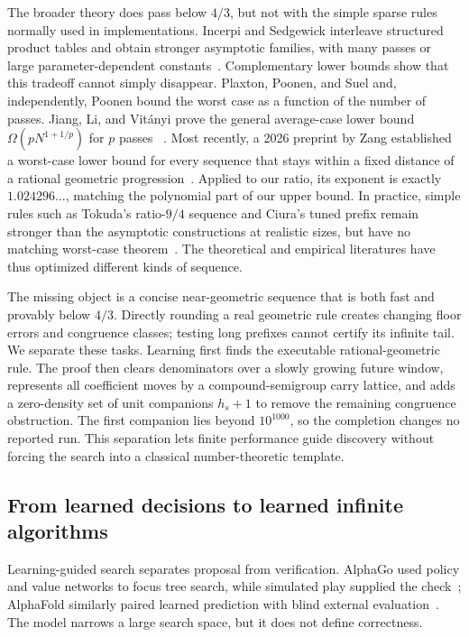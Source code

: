 The broader theory does pass below $4/3$, but not with the simple sparse rules
normally used in implementations.  Incerpi and Sedgewick interleave structured
product tables and obtain stronger asymptotic families, with many passes or
large parameter-dependent constants~\cite{incerpi1985}.  Complementary lower
bounds show that this tradeoff cannot simply disappear.  Plaxton, Poonen, and
Suel and, independently, Poonen bound the worst case as a function of the
number of passes.  Jiang, Li, and Vit\'anyi prove the general average-case lower
bound $\Omega(pN^{1+1/p})$ for $p$ passes
~\cite{plaxtonpoonen1992,poonen1993,jiang2000}.  Most recently, a 2026 preprint
by Zang established a worst-case lower bound for every sequence that stays
within a fixed distance of a rational geometric progression~\cite{zang2026}.
Applied to our ratio,
its exponent is exactly $1.024296\ldots$, matching the polynomial part of our
upper bound.  In practice, simple rules such
as Tokuda's ratio-$9/4$ sequence and Ciura's tuned prefix remain stronger than
the asymptotic constructions at realistic sizes, but have no matching
worst-case theorem~\cite{tokuda1992,ciura2001}.  The theoretical and empirical
literatures have thus optimized different kinds of sequence.

The missing object is a concise near-geometric sequence that is both fast and
provably below $4/3$.  Directly rounding a real geometric rule creates changing
floor errors and congruence classes; testing long prefixes cannot certify its
infinite tail.  We separate these tasks.  Learning first finds the executable
rational-geometric rule.  The proof then clears denominators over a slowly
growing future window, represents all coefficient moves by a compound-semigroup
carry lattice, and adds a zero-density set of unit companions $h_s+1$ to remove
the remaining congruence obstruction.  The first companion lies beyond
$10^{1000}$, so the completion changes no reported run.  This separation lets
finite performance guide discovery without forcing the search into a classical
number-theoretic template.

\subsection{From learned decisions to learned infinite algorithms}

Learning-guided search separates proposal from verification.  AlphaGo used
policy and value networks to focus tree search, while simulated play supplied
the check~\cite{silver2016alphago}; AlphaFold similarly paired learned
prediction with blind external evaluation~\cite{jumper2021alphafold}.  The
model narrows a large search space, but it does not define correctness.

